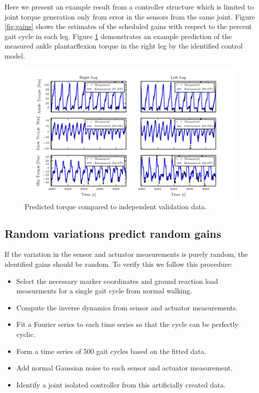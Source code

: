 \documentclass{article}
\begin{document}
Here we present an example result from a controller structure which is limited
to joint torque generation only from error in the sensors from the same joint.
Figure \ref{fig:gains} shows the estimates of the scheduled gains with respect
to the percent gait cycle in each leg. Figure \ref{fig:fit} demonstrates an
example prediction of the measured ankle plantarflexion torque in the right leg
by the identified control model.
%
\begin{figure}
  \begin{center}
    \includegraphics{figures/example-identified-joint-isolated-fit.pdf}
    \caption{Predicted torque compared to independent validation data.}
    \label{fig:fit}
  \end{center}
\end{figure}
%
\subsection*{Random variations predict random gains}
%
If the variation in the sensor and actuator measurements is purely random, the
identified gains should be random. To verify this we follow this procedure:

\begin{itemize}
  \item Select the necessary marker coordinates and ground reaction load
    measurments for a single gait cycle from normal walking.
  \item Compute the inverse dynamics from sensor and actuator measurements.
  \item Fit a Fourier series to each time series so that the cycle can be
    perfectly cyclic.
  \item Form a time series of 500 gait cycles based on the fitted data.
  \item Add normal Gaussian noise to each sensor and actuator measurement.
  \item Identify a joint isolated controller from this artificially created
    data.
\end{itemize}
\end{document}
